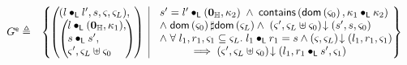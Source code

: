 \begin{definition}[Guarantee]
\[
\begin{array}{r l}

	\extendG \eqdef &
 	\left\{
 	\hspace*{-0.2cm}
	 \begin{array}{l | r}
	   \left(
	   \hspace*{-0.2cm}
	   \begin{array}{l}
	     (l \composeL l', s, \amod{}, \amod{L}),\\
 	     \left(
	     \hspace*{-0.2cm}
	     \begin{array}{l}
	      l \composeL (\unitH, \ca{1}),\\
	      s \composeL s',\\
	      \amod{}', \amod{L} \uplus \amod{0}
	     \end{array}
 	    \hspace*{-0.2cm}
 	    \right)
	   \end{array}
	   \hspace*{-0.2cm}
 	  \right)
	   &
 	  \begin{array}{l}
 	  	s' = l' \composeL (\unitH, \ca{2})  \;\land\; \contains{\dom{\amod{0}}}{\ca{1} \composeL \ca{2}}\\
 	  	
 	  	\land\; \dom{\amod{0}} \disjoint \dom{\amod{L}}
			\land\; \extendsAM{\amod{}', \amod{L} \uplus \amod{0}}{s'}{s}{\amod{0}}\\
			
			\land\; \for{l_1, r_1, \amod{1} \subseteq \amod{L}} l_1 \composeL r_1 = s \land \extendsAM{\amod{}, \amod{L}}{l_1}{r_1}{\amod{1}}  \\
			\hspace*{1cm} \implies\extendsAM{\amod{}', \amod{L} \uplus \amod{0}}{l_1}{r_1 \composeL s'}{\amod{1}}
			
     	
   	\end{array}
   	\hspace*{-0.15cm}
 	\end{array}
 	\hspace*{-0.2cm}
	\right\}\\\\
	

\end{array}\]
\end{definition}
